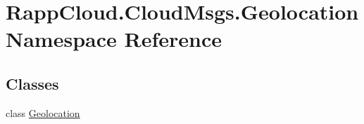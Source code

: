 \hypertarget{namespaceRappCloud_1_1CloudMsgs_1_1Geolocation}{\section{Rapp\-Cloud.\-Cloud\-Msgs.\-Geolocation Namespace Reference}
\label{namespaceRappCloud_1_1CloudMsgs_1_1Geolocation}
}
\subsection*{Classes}
\begin{DoxyCompactItemize}
\item 
class \hyperlink{classRappCloud_1_1CloudMsgs_1_1Geolocation_1_1Geolocation}{Geolocation}
\end{DoxyCompactItemize}
